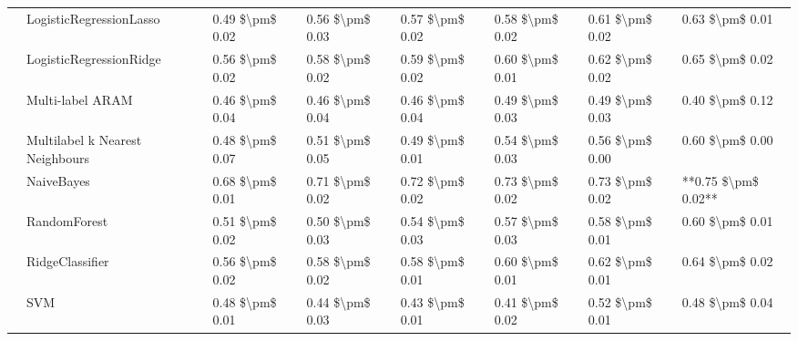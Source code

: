 \begin{tabular}{llllllll}
   & LogisticRegressionLasso &      0.49 \$\textbackslash pm\$ 0.02 &           0.56 \$\textbackslash pm\$ 0.03 &       0.57 \$\textbackslash pm\$ 0.02 &        0.58 \$\textbackslash pm\$ 0.02 &                         0.61 \$\textbackslash pm\$ 0.02 &      0.63 \$\textbackslash pm\$ 0.01 \\
   & LogisticRegressionRidge &      0.56 \$\textbackslash pm\$ 0.02 &           0.58 \$\textbackslash pm\$ 0.02 &       0.59 \$\textbackslash pm\$ 0.02 &        0.60 \$\textbackslash pm\$ 0.01 &                         0.62 \$\textbackslash pm\$ 0.02 &      0.65 \$\textbackslash pm\$ 0.02 \\
   & Multi-label ARAM &      0.46 \$\textbackslash pm\$ 0.04 &           0.46 \$\textbackslash pm\$ 0.04 &       0.46 \$\textbackslash pm\$ 0.04 &        0.49 \$\textbackslash pm\$ 0.03 &                         0.49 \$\textbackslash pm\$ 0.03 &      0.40 \$\textbackslash pm\$ 0.12 \\
   & Multilabel k Nearest Neighbours &      0.48 \$\textbackslash pm\$ 0.07 &           0.51 \$\textbackslash pm\$ 0.05 &       0.49 \$\textbackslash pm\$ 0.01 &        0.54 \$\textbackslash pm\$ 0.03 &                         0.56 \$\textbackslash pm\$ 0.00 &      0.60 \$\textbackslash pm\$ 0.00 \\
   & NaiveBayes &      0.68 \$\textbackslash pm\$ 0.01 &           0.71 \$\textbackslash pm\$ 0.02 &       0.72 \$\textbackslash pm\$ 0.02 &        0.73 \$\textbackslash pm\$ 0.02 &                         0.73 \$\textbackslash pm\$ 0.02 &  **0.75 \$\textbackslash pm\$ 0.02** \\
   & RandomForest &      0.51 \$\textbackslash pm\$ 0.02 &           0.50 \$\textbackslash pm\$ 0.03 &       0.54 \$\textbackslash pm\$ 0.03 &        0.57 \$\textbackslash pm\$ 0.03 &                         0.58 \$\textbackslash pm\$ 0.01 &      0.60 \$\textbackslash pm\$ 0.01 \\
   & RidgeClassifier &      0.56 \$\textbackslash pm\$ 0.02 &           0.58 \$\textbackslash pm\$ 0.02 &       0.58 \$\textbackslash pm\$ 0.01 &        0.60 \$\textbackslash pm\$ 0.01 &                         0.62 \$\textbackslash pm\$ 0.01 &      0.64 \$\textbackslash pm\$ 0.02 \\
   & SVM &      0.48 \$\textbackslash pm\$ 0.01 &           0.44 \$\textbackslash pm\$ 0.03 &       0.43 \$\textbackslash pm\$ 0.01 &        0.41 \$\textbackslash pm\$ 0.02 &                         0.52 \$\textbackslash pm\$ 0.01 &      0.48 \$\textbackslash pm\$ 0.04 \\

\end{tabular}
